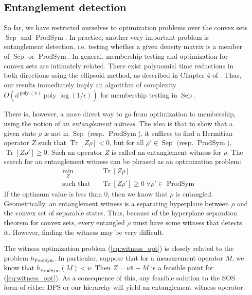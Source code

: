 \documentclass[aps,pra,notitlepage,preprintnumbers,11pt,tightenlines]{revtex4-1}
\newcommand{\ident}{\mathbb{1}}
\DeclareMathOperator{\ProdSym}{ProdSym}
\DeclareMathOperator{\Sep}{Sep}
\DeclareMathOperator{\Tr}{Tr}
\DeclareMathOperator{\poly}{poly}
\begin{document}
\subsection{Entanglement detection}\label{sec:witness}
So far, we have restricted ourselves to optimization problems over the
convex sets $\Sep$ and $\ProdSym$. In practice, another very important
problem is entanglement detection, i.e. testing whether a given
density matrix is a member of $\Sep$ or $\ProdSym$. In general,
membership testing and optimization for convex sets are intimately
related. There exist polynomial time reductions in both directions
using the ellipsoid method, as described in Chapter 4 of
\cite{gls:1993}. Thus, our results immediately imply an algorithm of complexity
$O(d^{\poly(n)} \poly\log(1/\epsilon))$ for membership testing in
$\Sep$. 

There is, however, a more direct way to go from optimization to
membership, using the notion of an \emph{entanglement witness}. The
idea is that to show that a given state $\rho$ is not in $\Sep$
(resp. $\ProdSym$), it suffices to find a Hermitian operator $Z$ such that
$\Tr[Z \rho] < 0$, but for all $\rho' \in \Sep$ (resp. $\ProdSym$),
$\Tr[Z \rho'] \geq 0$. Such an operator $Z$ is called an entanglement
witness for $\rho$. The search for an entanglement witness can be
phrased as an optimization problem:
\begin{equation}
  \label{eq:witness_opt}
  \begin{aligned}
    &\min_Z && \Tr[Z \rho] \\
    &\text{such that} && \Tr[Z \rho'] \geq 0 \; \forall \rho' \in \ProdSym
  \end{aligned}
\end{equation}
If the optimum value is less than $0$, then we know that $\rho$ is
entangled. Geometrically, an entanglement witness is a
separating hyperplane between $\rho$ and the convex set of separable
states. Thus, because of the hyperplane separation theorem for convex sets, every entangled $\rho$ must have some
witness that detects it. However, finding the witness may be very
difficult.

The witness optimization problem (\ref{eq:witness_opt}) is closely
related to the problem $h_{\ProdSym}$. In particular, suppose that for a
measurement operator $M$, we know that $h_{\ProdSym}(M) < \nu$. Then
$Z = \nu \ident - M$ is a feasible point
for (\ref{eq:witness_opt}). As a consequence of this, any feasible
solution to the SOS form of either DPS or our hierarchy will yield an
entanglement witness operator.
\end{document}
